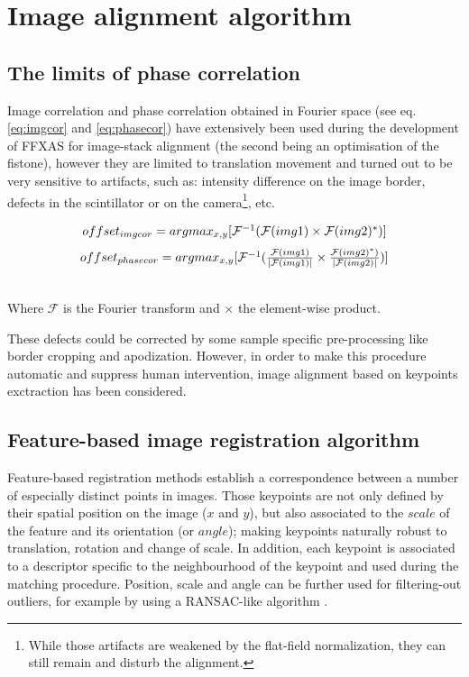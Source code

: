 \documentclass[preprint]{iucr}
\begin{document}
\section{Image alignment algorithm}

\subsection{The limits of phase correlation}

Image correlation and phase correlation obtained in Fourier space (see eq.
\ref{eq:imgcor} and \ref{eq:phasecor}) have
extensively been used during the development of FFXAS for image-stack alignment
(the second being an optimisation of the fistone), however they are
limited to translation movement and turned out to be very sensitive to artifacts, such as:
intensity difference on the image border, defects in the
scintillator or on the camera\footnote{While those artifacts are weakened by
the flat-field normalization, they can still remain and disturb the alignment.},
etc.

\begin{center}
\begin{equation}
\label{eq:imgcor}
$$offset_{img cor} =
argmax_{x,y}[\mathcal{F}^{-1}(\mathcal{F}(img1)\times\mathcal{F}(img2)^*)]$$
\end{equation}
\begin{equation}
\label{eq:phasecor}
$$offset_{phase cor} =
argmax_{x,y}[\mathcal{F}^{-1}(\frac{\mathcal{F}(img1)}{|\mathcal{F}(img1)|}
\times\frac{\mathcal{F}(img2)^*)}{|\mathcal{F}(img2)|})]$$
\end{equation}

\\Where $\mathcal{F}$ is the Fourier transform and $\times$ the element-wise
product.
\end{center}

These defects could be corrected by some sample
specific pre-processing like border cropping and apodization.
However, in order to make this procedure automatic and suppress human
intervention, image alignment based on keypoints exctraction has been
considered.

\subsection{Feature-based image registration algorithm}

Feature-based registration methods establish a correspondence between a
number of especially distinct points in images.
Those keypoints are not only defined by their spatial position on the image
($x$ and $y$), but also associated to the $scale$ of the feature and its
orientation (or $angle$);
making keypoints naturally robust to
translation, rotation and change of scale.
In addition, each keypoint is associated to a descriptor specific to the
neighbourhood of the keypoint and used during the matching procedure. Position,
scale and angle can be further used for filtering-out outliers, for example by
using a RANSAC-like algorithm \cite{orsa}.
\end{document}
